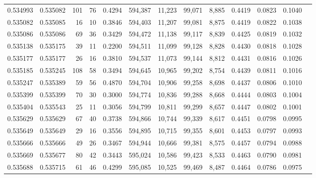 \begin{tabular}{rrrrrrrrrrrrr}
0.534993 & 0.535082 &   101 &    76 &                                     0.4294 & 594,387 &  11,223 &  99,071 &   8,885 & 0.4419 & 0.0823 & 0.1040 \\
0.535082 & 0.535085 &    16 &    10 &                                     0.3846 & 594,403 &  11,207 &  99,081 &   8,875 & 0.4419 & 0.0822 & 0.1038 \\
0.535086 & 0.535086 &    69 &    36 &                                     0.3429 & 594,472 &  11,138 &  99,117 &   8,839 & 0.4425 & 0.0819 & 0.1032 \\
0.535138 & 0.535175 &    39 &    11 &                                     0.2200 & 594,511 &  11,099 &  99,128 &   8,828 & 0.4430 & 0.0818 & 0.1028 \\
0.535177 & 0.535177 &    26 &    16 &                                     0.3810 & 594,537 &  11,073 &  99,144 &   8,812 & 0.4431 & 0.0816 & 0.1026 \\
0.535185 & 0.535245 &   108 &    58 &                                     0.3494 & 594,645 &  10,965 &  99,202 &   8,754 & 0.4439 & 0.0811 & 0.1016 \\
0.535247 & 0.535389 &    59 &    56 &                                     0.4870 & 594,704 &  10,906 &  99,258 &   8,698 & 0.4437 & 0.0806 & 0.1010 \\
0.535399 & 0.535399 &    70 &    30 &                                     0.3000 & 594,774 &  10,836 &  99,288 &   8,668 & 0.4444 & 0.0803 & 0.1004 \\
0.535404 & 0.535543 &    25 &    11 &                                     0.3056 & 594,799 &  10,811 &  99,299 &   8,657 & 0.4447 & 0.0802 & 0.1001 \\
0.535629 & 0.535629 &    67 &    40 &                                     0.3738 & 594,866 &  10,744 &  99,339 &   8,617 & 0.4451 & 0.0798 & 0.0995 \\
0.535649 & 0.535649 &    29 &    16 &                                     0.3556 & 594,895 &  10,715 &  99,355 &   8,601 & 0.4453 & 0.0797 & 0.0993 \\
0.535666 & 0.535666 &    49 &    26 &                                     0.3467 & 594,944 &  10,666 &  99,381 &   8,575 & 0.4457 & 0.0794 & 0.0988 \\
0.535669 & 0.535677 &    80 &    42 &                                     0.3443 & 595,024 &  10,586 &  99,423 &   8,533 & 0.4463 & 0.0790 & 0.0981 \\
0.535688 & 0.535715 &    61 &    46 &                                     0.4299 & 595,085 &  10,525 &  99,469 &   8,487 & 0.4464 & 0.0786 & 0.0975 \\

\end{tabular}
